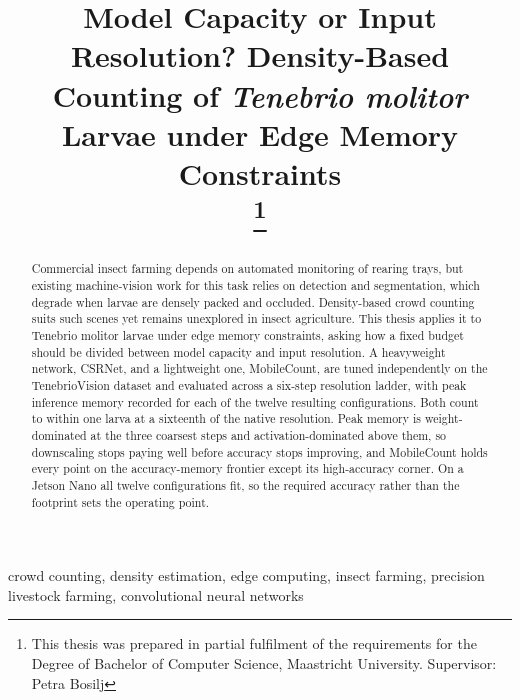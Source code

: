 \documentclass[conference]{IEEEtran}
\begin{document}
\title{Model Capacity or Input Resolution? Density-Based Counting of
\textit{Tenebrio molitor} Larvae under Edge Memory Constraints\\
\thanks{This thesis was prepared in partial fulfilment of the requirements for the Degree of Bachelor of Computer Science, Maastricht University. Supervisor: Petra Bosilj}
}

\author{
}

\maketitle

\begin{abstract}
Commercial insect farming depends on automated monitoring of rearing trays,
but existing machine-vision work for this task relies on detection and
segmentation, which degrade when larvae are densely packed and occluded.
Density-based crowd counting suits such scenes yet remains unexplored in insect
agriculture. This thesis applies it to Tenebrio molitor larvae under edge memory
constraints, asking how a fixed budget should be divided between model capacity
and input resolution. A heavyweight network, CSRNet, and a lightweight one,
MobileCount, are tuned independently on the TenebrioVision dataset and evaluated
across a six-step resolution ladder, with peak inference memory recorded for
each of the twelve resulting configurations. Both count to within one larva at a
sixteenth of the native resolution. Peak memory is weight-dominated at the three
coarsest steps and activation-dominated above them, so downscaling stops paying
well before accuracy stops improving, and MobileCount holds every point on the
accuracy-memory frontier except its high-accuracy corner. On a Jetson Nano all
twelve configurations fit, so the required accuracy rather than the footprint
sets the operating point.
\end{abstract}

\begin{IEEEkeywords}
crowd counting, density estimation, edge computing, insect farming,
precision livestock farming, convolutional neural networks
\end{IEEEkeywords}
\end{document}

